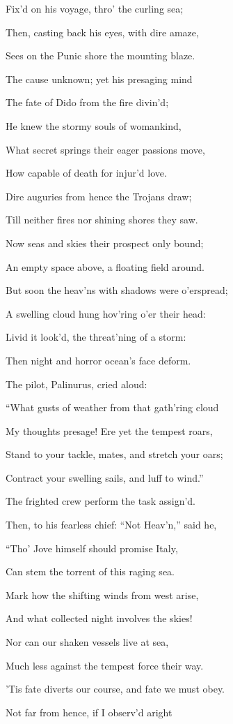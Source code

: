 Fix’d on his voyage, thro’ the curling sea;

Then, casting back his eyes, with dire amaze,

Sees on the Punic shore the mounting blaze.

The cause unknown; yet his presaging mind

The fate of Dido from the fire divin’d;

He knew the stormy souls of womankind,

What secret springs their eager passions move,

How capable of death for injur’d love.

Dire auguries from hence the Trojans draw;

Till neither fires nor shining shores they saw.

Now seas and skies their prospect only bound;

An empty space above, a floating field around.

But soon the heav’ns with shadows were o’erspread;

A swelling cloud hung hov’ring o’er their head:

Livid it look’d, the threat’ning of a storm:

Then night and horror ocean’s face deform.

The pilot, Palinurus, cried aloud:

“What gusts of weather from that gath’ring cloud

My thoughts presage! Ere yet the tempest roars,

Stand to your tackle, mates, and stretch your oars;

Contract your swelling sails, and luff to wind.”

The frighted crew perform the task assign’d.

Then, to his fearless chief: “Not Heav’n,” said he,

“Tho’ Jove himself should promise Italy,

Can stem the torrent of this raging sea.

Mark how the shifting winds from west arise,

And what collected night involves the skies!

Nor can our shaken vessels live at sea,

Much less against the tempest force their way.

’Tis fate diverts our course, and fate we must obey.

Not far from hence, if I observ’d aright

